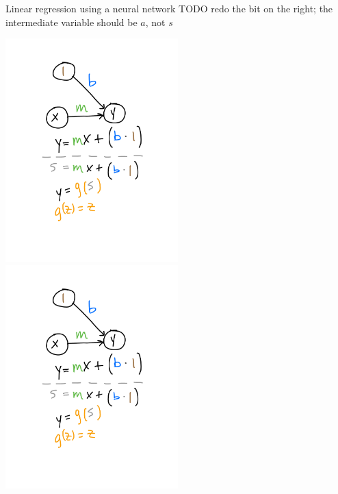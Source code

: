\documentclass[xetex,compress]{beamer}
\begin{document}
\begin{frame}{Linear regression using a neural network}
  TODO redo the bit on the right; the intermediate variable should be \(a\), not \(s\)
  \begin{center}
    \includegraphics[width=0.50\textwidth]{./figures/lr_nn_1.pdf}
    \includegraphics[width=0.50\textwidth]{./figures/lr_nn_2.pdf}
  \end{center}
\end{frame}
\end{document}
